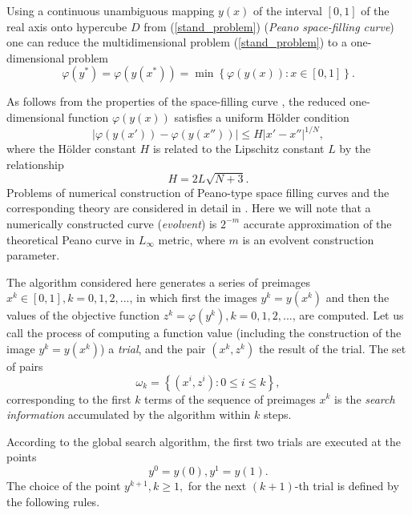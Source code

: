\documentclass[smallcondensed]{svjour3}     %
\begin{document}
Using a continuous unambiguous mapping $y(x)$ of the interval $[0,1]$ of the real axis onto hypercube $D$ from (\ref{stand_problem}) (\textit{Peano space-filling curve}) one can reduce the multidimensional problem (\ref{stand_problem}) to a one-dimensional problem
\begin{equation}\label{u_problem}
\varphi(y^\ast)=\varphi(y(x^\ast))=\min{\left\{\varphi(y(x)): x\in[0,1]\right\}}.
\end{equation}

As follows from the properties of the space-filling curve \cite{Strongin2000}, the reduced one-dimensional function $\varphi(y(x))$ satisfies a uniform H{\"o}lder condition
\[
\left|\varphi(y(x'))-\varphi(y(x''))\right|\leq H\left|x'-x''\right|^{1/N},
\]
where the H{\"o}lder constant $H$ is related to the Lipschitz constant $L$ by the relationship 
\begin{equation}\label{L_and_H}
H=2L\sqrt{N+3}.
\end{equation}
Problems of numerical construction of Peano-type space filling curves and the corresponding theory are considered in detail in \cite{Strongin2000,Sergeyev2013}. Here we will note that a numerically constructed curve (\textit{evolvent}) is $2^{-m}$ accurate approximation of the theoretical Peano curve in $L_\infty$ metric, where $m$ is an evolvent construction parameter. 

The algorithm considered here generates a series of preimages  $x^k\in[0,1], k=0,1,2,...$, in which first the images $y^k=y(x^k)$ and then the values of the objective function $z^k=\varphi(y^k), k=0, 1, 2, ...$,  are computed. Let us call the process of computing a function value (including the construction of the image $y^k=y(x^k)$) a \textit{trial}, and the pair $(x^k, z^k)$ the result of the trial. The set of pairs
\[
\omega_k=\left\{(x^i,z^i):0\leq i \leq k\right\},
\]
corresponding to the first $k$ terms of the sequence of preimages ${x^k}$ is the \textit{search information} accumulated by the algorithm within $k$ steps. 

According to the global search algorithm, the first two trials are executed at the points 
\[
y^0=y(0), y^1=y(1).
\]
The choice of the point $y^{k+1},k\geq 1,$  for the next $(k+1)$-th trial is defined by the following rules.
\end{document}
